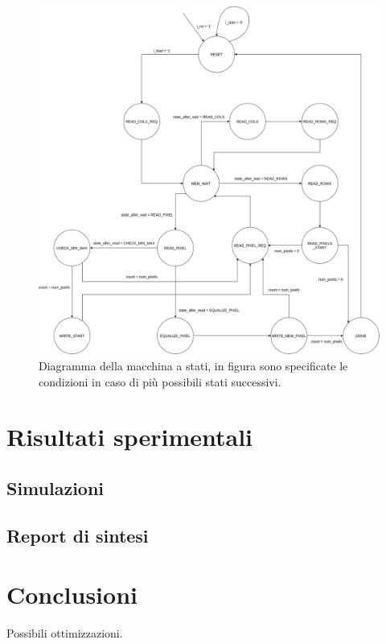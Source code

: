 \documentclass{article}
\begin{document}
\begin{figure}[h]
    \includegraphics[width=\textwidth]{diagram.png}
    \centering
    \caption{Diagramma della macchina a stati, in figura sono specificate le condizioni in caso di più possibili stati successivi.}
\end{figure}


\pagebreak
\section{Risultati sperimentali}
\subsection{Simulazioni}
\subsection{Report di sintesi}

\pagebreak
\section{Conclusioni}
Possibili ottimizzazioni.

\printbibliography
\end{document}

